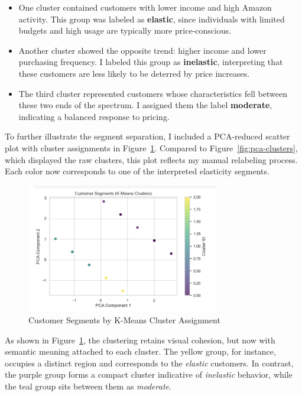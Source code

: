 \documentclass[12pt]{article}
\begin{document}
\begin{itemize}
    \item One cluster contained customers with lower income and high Amazon activity. This group was labeled as \textbf{elastic}, since individuals with limited budgets and high usage are typically more price-conscious.
    \item Another cluster showed the opposite trend: higher income and lower purchasing frequency. I labeled this group as \textbf{inelastic}, interpreting that these customers are less likely to be deterred by price increases.
    \item The third cluster represented customers whose characteristics fell between these two ends of the spectrum. I assigned them the label \textbf{moderate}, indicating a balanced response to pricing.
\end{itemize}

To further illustrate the segment separation, I included a PCA-reduced scatter plot with cluster assignments in Figure~\ref{fig:cluster-assignment}. Compared to Figure~\ref{fig:pca-clusters}, which displayed the raw clusters, this plot reflects my manual relabeling process. Each color now corresponds to one of the interpreted elasticity segments.

\begin{figure}[h!]
  \centering
  \includegraphics[width=0.75\textwidth]{figures/customer segments (kmeans clusters).png}
  \caption{Customer Segments by K-Means Cluster Assignment}
  \label{fig:cluster-assignment}
\end{figure}

As shown in Figure~\ref{fig:cluster-assignment}, the clustering retains visual cohesion, but now with semantic meaning attached to each cluster. The yellow group, for instance, occupies a distinct region and corresponds to the \textit{elastic} customers. In contrast, the purple group forms a compact cluster indicative of \textit{inelastic} behavior, while the teal group sits between them as \textit{moderate}.
\end{document}
